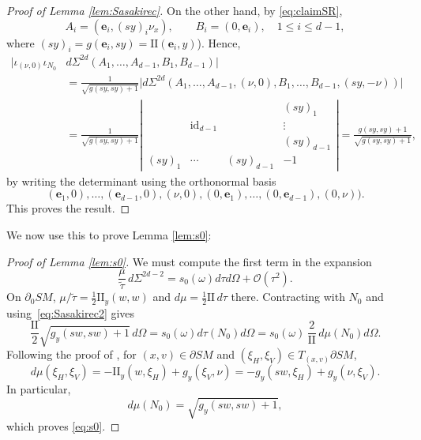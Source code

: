 \documentclass[11pt]{article}
\let\cal\mathcal
\theoremstyle{plain}
\theoremstyle{definition}
\theoremstyle{remark}
\def\t{\tilde{\tau}}
\def\two{\mathrm{II}}
\newcommand{\be}{{\boldsymbol{e}}}
\begin{document}
\begin{proof}[Proof of Lemma \ref{lem:Sasakirec}]
On the other hand, by \eqref{eq:claimSR},\vspace*{-3pt}
\begin{equation*}
A_i = (\be_i, (sy)_i \nu_x), \qquad B_i = (0,\be_i), \quad 1\le i\le d-1,
\end{equation*}
where $(sy)_i = g(\be_i, sy) = \two(\be_i,y)$). Hence,\vspace*{-3pt}
\begin{align*}
\bigl|\iota_{(\nu,0)} \iota_{N_0} &d\Sigma^{2d} (A_1,\dots,A_{d-1}, B_1, B_{d-1})\bigr| \\
&= \frac{1}{\sqrt{g(sy,sy)+1}} \bigl|d\Sigma^{2d} (A_1,\dots,A_{d-1}, (\nu,0), B_1,\dots, B_{d-1}, (sy,-\nu))\bigr| \\
&= \frac{1}{\sqrt{g(sy,sy)+1}} \left|
\begin{array}{ccc|c}
& & & (sy)_1 \\
& \mathrm{id}_{d-1} & & \vdots \\
& & & (sy)_{d-1} \\
\hline
(sy)_1 & \cdots & (sy)_{d-1} & -1
\end{array}
\right| = \frac{g(sy,sy)+1}{\sqrt{g(sy,sy)+1}},
\end{align*}
by writing the determinant using the orthonormal basis\vspace*{-3pt}
\begin{equation*}
(\be_1,0), \dots, (\be_{d-1},0), (\nu,0), (0,\be_1), \dots, (0,\be_{d-1}),(0,\nu)).
\end{equation*}
This proves the result.
\end{proof}

We now use this to prove Lemma \ref{lem:s0}:

\begin{proof}[Proof of Lemma \ref{lem:s0}] We must compute the first term in the expansion
\begin{equation*}
\frac{\mu}{\t}\, d\Sigma^{2d-2} = s_0(\omega) d\tau d\Omega + {\cal O}(\tau^2).
\end{equation*}
On $\partial_0 SM$, $\mu/\t \!=\! \frac12 \two_y(w,w)$ and $d\mu \!=\! \frac12 \two\, d\tau$ there. Contracting
with $N_0$ and using~\eqref{eq:Sasakirec2} gives
\begin{equation*}
\frac{\two}{2} \sqrt{g_y(sw,sw)+1}\,d\Omega = s_0 (\omega) d\tau(N_0) d\Omega = s_0(\omega)\, \frac{2}{\two}\, d\mu(N_0) d\Omega.
\end{equation*}
Following the proof of \cite[Lem.\,3.3.6]{Paternain2021}, for $(x,v)\in \partial SM$ and $(\xi_H,\xi_V) \in T_{(x,v)} \partial SM$,
\begin{equation*}
d\mu (\xi_H, \xi_V) = - \two_y (w,\xi_H) + g_y(\xi_V, \nu) = - g_y(sw, \xi_H) + g_y(\nu, \xi_V).
\end{equation*}
In particular,
\begin{equation*}
d\mu(N_0) = \sqrt{g_y(sw,sw) + 1},
\end{equation*}
which proves \eqref{eq:s0}.
\end{proof}
\end{document}
